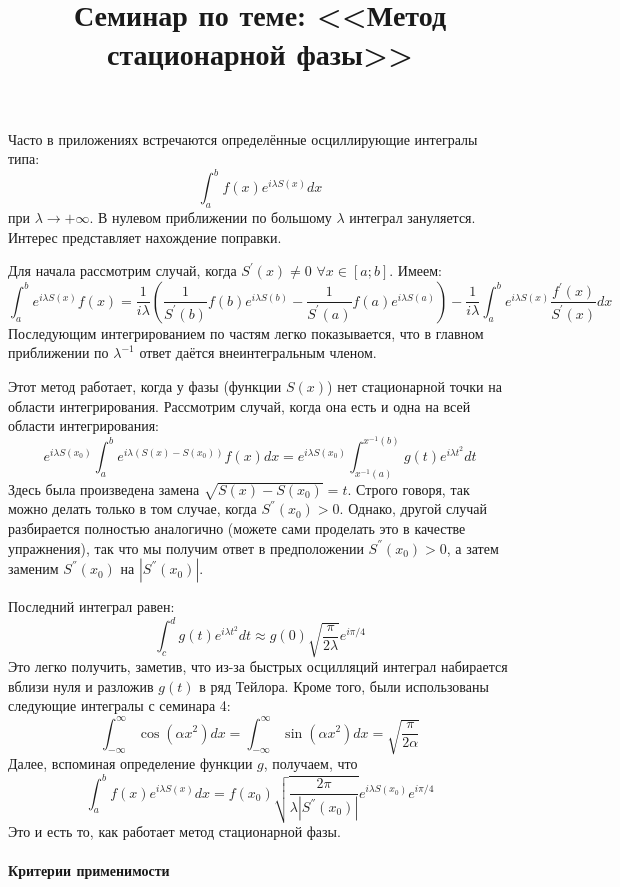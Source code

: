\documentclass[a4paper,12pt]{article}
\begin{document}
\title{Семинар по теме: <<Метод стационарной фазы>>}
\maketitle


Часто в приложениях встречаются определённые осциллирующие интегралы
типа: 
\[
\int_{a}^{b}f(x)e^{i\lambda S(x)}dx
\]
при $\lambda\to+\infty$. В нулевом приближении по большому $\lambda$ интеграл зануляется. Интерес представляет нахождение поправки.  

\noindent
Для начала рассмотрим случай, когда $S^{'}(x)\ne0$ $\forall x\in [a;b]$. Имеем:
$$
\int_{a}^{b}e^{i\lambda S(x)}f(x)=\frac{1}{i\lambda}\left(\frac{1}{S^{'}(b)}f(b)e^{i\lambda S(b)}-\frac{1}{S^{'}(a)}f(a)e^{i\lambda S(a)}\right)-\frac{1}{i\lambda}\int_{a}^{b}e^{i\lambda S(x)}\frac{f^{'}(x)}{S^{'}(x)}dx
$$
Последующим интегрированием по частям легко показывается, что в главном приближении по $\lambda^{-1}$ ответ даётся внеинтегральным членом.

\noindent
Этот метод работает, когда у фазы (функции $S(x)$) нет стационарной точки на области интегрирования. Рассмотрим случай, когда она есть и одна на всей области интегрирования:
$$
e^{i\lambda S(x_0)}\int_{a}^{b}e^{i\lambda( S(x)-S(x_0))}f(x)dx=e^{i\lambda S(x_0)}\int_{x^{-1}(a)}^{x^{-1}(b)}g(t)e^{i\lambda t^2}dt
$$
Здесь была произведена замена $\sqrt{S(x)-S(x_0)}=t$. Строго говоря, так можно делать только в том случае, когда $S^{''}(x_0)>0$. Однако, другой случай разбирается полностью аналогично (можете сами проделать это в качестве упражнения), так что мы получим ответ в предположении $S^{''}(x_0)>0$, а затем заменим $S^{''}(x_0)$ на $|S^{''}(x_0)|$. 

\noindent
Последний интеграл равен:
$$
\int_{c}^{d}g(t)e^{i\lambda t^2}dt\approx g(0)\sqrt{\frac{\pi}{2\lambda}}e^{i\pi/4}
$$
Это легко получить, заметив, что из-за быстрых осцилляций интеграл набирается вблизи нуля и разложив $g(t)$ в ряд Тейлора. Кроме того, были использованы следующие интегралы с семинара 4:
\[
\int_{-\infty}^{\infty}\cos(\alpha x^{2})dx=\int_{-\infty}^{\infty}\sin(\alpha x^{2})dx=\sqrt{\frac{\pi}{2\alpha}}
\]
Далее, вспоминая определение функции $g$, получаем, что 
$$
\int_{a}^{b}f(x)e^{i\lambda S(x)}dx=f(x_0)\sqrt{\frac{2\pi}{\lambda |S^{''}(x_0)|}}e^{i\lambda S(x_0)}e^{i\pi/4}
$$
Это и есть то, как работает метод стационарной фазы.


\paragraph{Критерии применимости}
\end{document}

